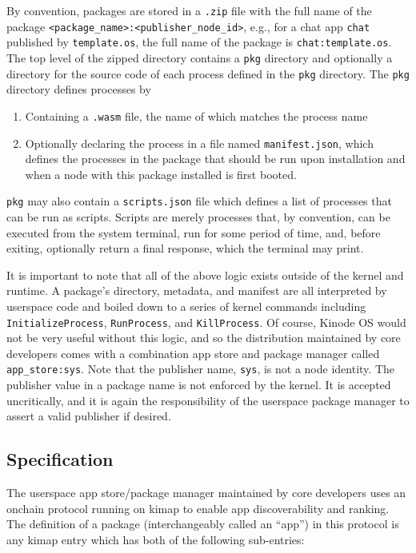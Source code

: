 \documentclass[runningheads]{llncs}
\begin{document}
By convention, packages are stored in a \verb|.zip| file with the full name of the package \verb|<package_name>:<publisher_node_id>|, e.g., for a chat app \verb|chat| published by \verb|template.os|, the full name of the package is \verb|chat:template.os|.
The top level of the zipped directory contains a \verb|pkg| directory and optionally a directory for the source code of each process defined in the \verb|pkg| directory.
The \verb|pkg| directory defines processes by
\begin{enumerate}
    \item Containing a \verb|.wasm| file, the name of which matches the process name
    \item Optionally declaring the process in a file named \verb|manifest.json|, which defines the processes in the package that should be run upon installation and when a node with this package installed is first booted.
\end{enumerate}

\verb|pkg| may also contain a \verb|scripts.json| file which defines a list of processes that can be run as scripts.
Scripts are merely processes that, by convention, can be executed from the system terminal, run for some period of time, and, before exiting, optionally return a final response, which the terminal may print.

It is important to note that all of the above logic exists outside of the kernel and runtime.
A package's directory, metadata, and manifest are all interpreted by userspace code and boiled down to a series of kernel commands including \verb|InitializeProcess|, \verb|RunProcess|, and \verb|KillProcess|.
Of course, Kinode OS would not be very useful without this logic, and so the distribution maintained by core developers comes with a combination app store and package manager called \verb|app_store:sys|.
Note that the publisher name, \verb|sys|, is not a node identity.
The publisher value in a package name is not enforced by the kernel.
It is accepted uncritically, and it is again the responsibility of the userspace package manager to assert a valid publisher if desired.

\subsection{Specification}
\label{sec:packagemanagerspec}

The userspace app store/package manager maintained by core developers uses an onchain protocol running on kimap to enable app discoverability and ranking.
The definition of a package (interchangeably called an ``app'') in this protocol is any kimap entry which has both of the following sub-entries:
\end{document}
